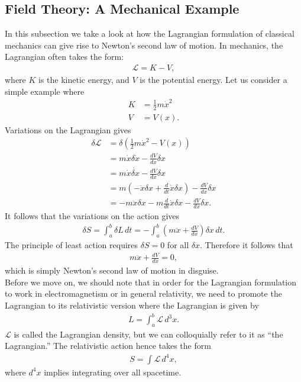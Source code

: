 \documentclass[a4paper,11pt]{article}
\numberwithin{equation}{section}
\theoremstyle{definition}
\begin{document}
\subsection{Field Theory: A Mechanical Example}
In this subsection we take a look at how the Lagrangian formulation of classical mechanics can give rise to Newton's second law of motion. In mechanics, the Lagrangian often takes the form:
\begin{align}
\mathcal{L} = K - V,
\end{align}
where $K$ is the kinetic energy, and $V$ is the potential energy. Let us consider a simple example where
\begin{align*}
K &= \frac{1}{2}m\dot{x}^2\\
V &= V(x).
\end{align*}
Variations on the Lagrangian gives
\begin{align*}
\delta \mathcal{L} &= \delta\left( \frac{1}{2}m\dot{x}^2 - V(x) \right)\\
&= m\dot{x}\delta \dot{x} - \frac{dV}{dx}\delta x\\
&= m\dot{x}\dot{\delta x} - \frac{dV}{dx}\delta x\\
&= m \left( -\ddot{x}\delta x + \frac{d}{dt}\dot{x}\delta x \right) - \frac{dV}{dx}\delta x\\
&= -m\ddot{x}\delta x - m\frac{d}{dt}\dot{x}\delta x - \frac{dV}{dx}\delta x. 
\end{align*}
It follows that the variations on the action gives
\begin{align*}
\delta S = \int_{a}^{b}\delta L \,dt = -\int_a^b\left( m\ddot{x} + \frac{dV}{dx} \right)\delta x\,dt.
\end{align*}
The principle of least action requires $\delta S = 0$ for all $\delta x$. Therefore it follows that
\begin{align*}
m\ddot{x} + \frac{dV}{dx} = 0,
\end{align*}
which is simply Newton's second law of motion in disguise. \\

Before we move on, we should note that in order for the Lagrangian formulation to work in electromagnetism or in general relativity, we need to promote the Lagrangian to its relativistic version where the Lagrangian is given by
\begin{align*}
L = \int_a^b\mathcal{L}\,d^3x.
\end{align*}
$\mathcal{L}$ is called the Lagrangian density, but we can colloquially refer to it as ``the Lagrangian.'' The relativistic action hence takes the form
\begin{align*}
S = \int \mathcal{L}\,d^4x,
\end{align*}
where $d^4x$ implies integrating over all spacetime.
\end{document}
